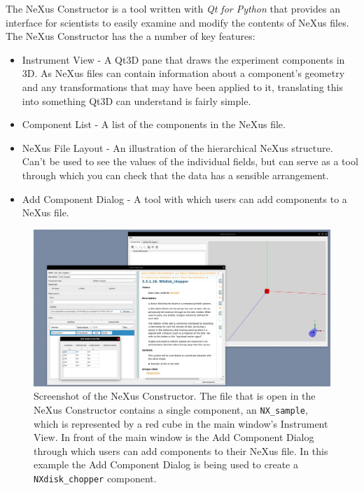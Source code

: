 The NeXus Constructor is a tool written with \textit{Qt for Python} that provides an interface for scientists to easily examine and modify the contents of NeXus files. The NeXus Constructor has the a number of key features:


\begin{itemize}
\item Instrument View - A Qt3D pane that draws the experiment components in 3D. As NeXus files can contain information about a component's geometry and any transformations that may have been applied to it, translating this into something Qt3D can understand is fairly simple.
\item Component List - A list of the components in the NeXus file.
\item NeXus File Layout - An illustration of the hierarchical NeXus structure. Can't be used to see the values of the individual fields, but can serve as a tool through which you can check that the data has a sensible arrangement.
\item Add Component Dialog - A tool with which users can add components to a NeXus file.
\end{itemize}

\begin{figure}
\includegraphics[width=\linewidth]{screenshot.png}
\caption{Screenshot of the NeXus Constructor. The file that is open in the NeXus Constructor contains a single component, an \texttt{NX\_sample}, which is represented by a red cube in the main window's Instrument View. In front of the main window is the Add Component Dialog through which users can add components to their NeXus file. In this example the Add Component Dialog is being used to create a \texttt{NXdisk\_chopper} component.}
\end{figure}

